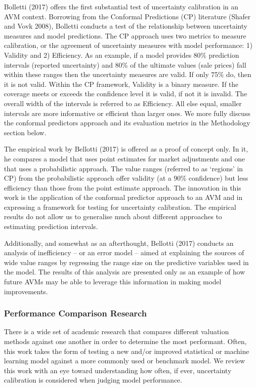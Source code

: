\documentclass[colTwo]{anon}
\theoremstyle{definition}
\begin{document}
Bolletti (2017) offers the first substantial test of uncertainty calibration in an AVM context.  Borrowing from the Conformal Predictions (CP) literature (Shafer and Vovk 2008), Bolletti conducts a test of the relationship between uncertainty measures and model predictions. The CP approach uses two metrics to measure calibration, or the agreement of uncertainty measures with model performance: 1) Validity and 2) Efficiency.  As an example, if a model provides 80\% prediction intervals (reported uncertainty) and 80\% of the ultimate values (sale prices) fall within these ranges then the uncertainty measures are valid.  If only 75\% do, then it is not valid. Within the CP framework, Validity is a binary measure.  If the coverage meets or exceeds the confidence level it is valid, if not it is invalid. The overall width of the intervals is referred to as Efficiency.  All else equal, smaller intervals are more informative or efficient than larger ones.  We more fully discuss the conformal predictors approach and its evaluation metrics in the Methodology section below. 

The empirical work by Bellotti (2017) is offered as a proof of concept only.  In it, he compares a model that uses point estimates for market adjustments and one that uses a probabilistic approach.  The value ranges (referred to as ‘regions’ in CP) from the probabilistic approach offer validity (at a 90\% confidence) but less efficiency than those from the point estimate approach.  The innovation in this work is the application of the conformal predictor approach to an AVM and in expressing a framework for testing for uncertainty calibration.  The empirical results do not allow us to generalise much about different approaches to estimating prediction intervals.   

Additionally, and somewhat as an afterthought, Bellotti (2017) conducts an analysis of inefficiency -- or an error model -- aimed at explaining the sources of wide value ranges by regressing the range size on the predictive variables used in the model.  The results of this analysis are presented only as an example of how future AVMs may be able to leverage this information in making model improvements. 

\subsubsection{Performance Comparison Research}

There is a wide set of academic research that compares different valuation methods against one another in order to determine the most performant.  Often, this work takes the form of testing a new and/or improved statistical or machine learning model against a more commonly used or benchmark model.  We review this work with an eye toward understanding how often, if ever, uncertainty calibration is considered when judging model performance. 
\end{document}
